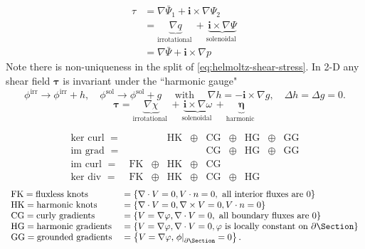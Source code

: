 \begin{equation}
\begin{aligned}
 \tau &= \nabla \bar{\Psi}_1 + \mathbf{i}\times\nabla\Psi_2 \\
&=\underbrace{\nabla q}_{\text {irrotational }}+\underbrace{\mathbf{i}\times \nabla \Psi}_{\text {solenoidal }} \\
&=\nabla \bar{\Psi}+\mathbf{i}\times \nabla p
\end{aligned}
\end{equation}
Note there is non-uniqueness in the split of \cref{eq:helmoltz-shear-stress}. In 2-D any shear field \(\bm{\tau}\) is invariant under the ``harmonic gauge"
$$
\phi^{\mathrm{irr}} \rightarrow \phi^{\mathrm{irr}}+h, \quad \phi^{\mathrm{sol}} \rightarrow \phi^{\mathrm{sol}}+g \quad \text { with } \quad \nabla h=-\mathbf{i} \times \nabla g,
\quad \Delta h=\Delta g=0 .
$$
\begin{equation*}
\boldsymbol{\tau}=\underbrace{\nabla \chi}_{\text {irrotational }}+\underbrace{\mathbf{i} \times \nabla \omega}_{\text {solenoidal }}+\underbrace{\boldsymbol{\eta}}_{\text {harmonic }}
\end{equation*}

\begin{equation}
\begin{array}{lccccccccc}
\mathrm{ker} \text { curl }= &  && \mathrm{HK} &\oplus& \mathrm{CG}& \oplus& \mathrm{HG} &\oplus& \mathrm{GG} \\
\mathrm{im } \text { grad }= &  &&             &      & \mathrm{CG} &\oplus& \mathrm{HG} &\oplus& \mathrm{GG} \\
\mathrm{im } \text { curl }= & \mathrm{FK} &\oplus& \mathrm{HK} &\oplus& \mathrm{CG} &\\
\mathrm{ker} \text { div  }= & \mathrm{FK} &\oplus& \mathrm{HK} &\oplus& \mathrm{CG} &\oplus& \mathrm{HG}
\end{array}
\end{equation}
\begin{equation}
\begin{array}{ll}
\mathrm{FK}=\text{fluxless knots } &=\{\nabla \cdot V=0, V \cdot n=0, \text { all interior fluxes are } 0\} \\
\mathrm{HK}=\text{harmonic knots } &=\{\nabla \cdot V=0, \nabla\times V=0, V \cdot n=0\} \\
\mathrm{CG}=\text{curly gradients} &=\{V=\nabla\varphi, \nabla\cdot V=0, \text { all boundary fluxes are } 0\} \\
\mathrm{HG}=\text{harmonic gradients}&=\{V=\nabla\varphi, \nabla\cdot V=0, \varphi \text{ is locally constant on } \partial \Section\} \\
\mathrm{GG}=\text {grounded gradients }&=\left\{V=\nabla \varphi,\left.\phi\right|_{\partial \Section}=0\right\} .
\end{array}
\end{equation}


